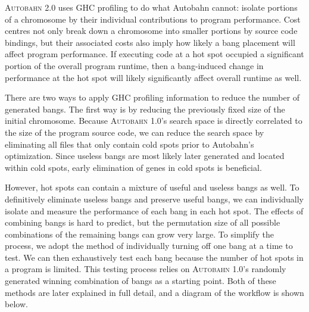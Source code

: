 \documentclass[format=sigplan, review=true]{acmart}
\newcommand{\hotspot}[0]{hot spot}
\newcommand{\hotspots}[0]{hot spots}
\newcommand{\coldspots}[0]{cold spots}
\newcommand{\useful}[0]{useful}
\newcommand{\useless}[0]{useless}
\newcommand{\Ao}[0]{\textsc{Autobahn 1.0}}
\newcommand{\At}[0]{\textsc{Autobahn 2.0}}
\begin{document}
\At{} uses GHC profiling to do what Autobahn cannot: isolate portions of a chromosome by their individual contributions to program performance. Cost centres not only break down a chromosome into smaller portions by source code bindings, but their associated costs also imply how likely a bang placement will affect program performance. If executing code at a \hotspot{} occupied a significant portion of the overall program runtime, then a bang-induced change in performance at the \hotspot{} will likely significantly affect overall runtime as well. 

There are two ways to apply GHC profiling information to reduce the number of generated bangs. The first way is by reducing the previously fixed size of the initial chromosome. Because \Ao{}'s search space is directly correlated to the size of the program source code, we can reduce the search space by eliminating all files that only contain \coldspots{} prior to Autobahn's optimization. Since \useless{} bangs are most likely later generated and located within \coldspots{}, early elimination of genes in \coldspots{} is beneficial. 

However, \hotspots{} can contain a mixture of \useful{} and \useless{} bangs as well. To definitively eliminate \useless{} bangs and preserve \useful{} bangs, we can individually isolate and measure the performance of each bang in each \hotspot{}. The effects of combining bangs is hard to predict, but the permutation size of all possible combinations of the remaining bangs can grow very large. To simplify the process, we adopt the method of individually turning off one bang at a time to test. We can then exhaustively test each bang because the number of \hotspots{} in a program is limited. This testing process relies on \Ao{}'s randomly generated winning combination of bangs as a starting point. Both of these methods are later explained in full detail, and a diagram of the workflow is shown below.
\newline
{}
\end{document}

